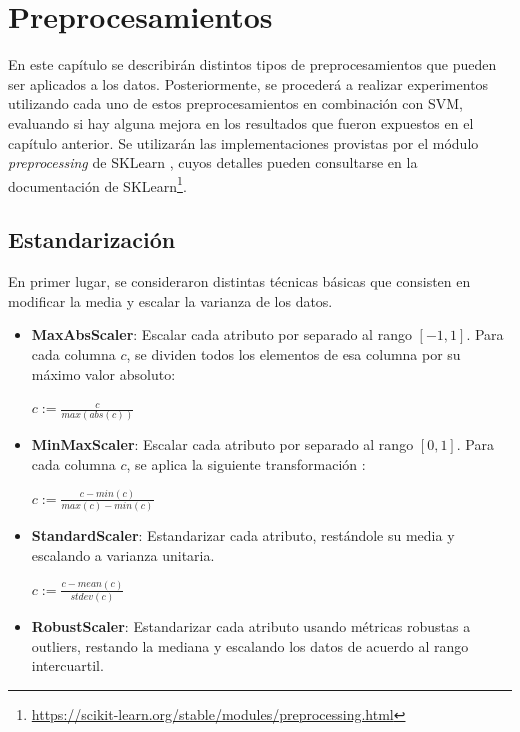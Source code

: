 \chapter{Preprocesamientos}

En este capítulo se describirán distintos tipos de preprocesamientos que pueden ser aplicados a los datos. Posteriormente, se procederá a realizar experimentos utilizando cada uno de estos preprocesamientos en combinación con SVM, evaluando si hay alguna mejora en los resultados que fueron expuestos en el capítulo anterior. Se utilizarán las implementaciones provistas por el módulo \textit{preprocessing} de SKLearn \cite{sklearn_api}, cuyos detalles pueden consultarse en la documentación de SKLearn\footnote{ \url{https://scikit-learn.org/stable/modules/preprocessing.html} }. 

\section { Estandarización }

En primer lugar, se consideraron distintas técnicas básicas que consisten en modificar la media y escalar la varianza de los datos. \cite{han2012mining}

\begin{itemize}
\item \textbf{MaxAbsScaler}: Escalar cada atributo por separado al rango $[-1,1]$. Para cada columna $c$, se dividen todos los elementos de esa columna por su máximo valor absoluto:

\begin{center}
$ c := \frac{c}{max(abs(c))} $
\end{center}

\item \textbf{MinMaxScaler}: Escalar cada atributo por separado al rango $[0,1]$. Para cada columna $c$, se aplica la siguiente transformación \cite{han2012mining}:

\begin{center}
$ c := \frac{ c - min(c) } { max(c) - min(c) }$
\end{center}

\item \textbf{StandardScaler}: Estandarizar cada atributo, restándole su media y escalando a varianza unitaria.

\begin{center}
$ c := \frac{ c - mean(c) } { stdev(c) }$
\end{center}

\item \textbf{RobustScaler}: Estandarizar cada atributo usando métricas robustas a outliers, restando la mediana y escalando los datos de acuerdo al rango intercuartil.

\end{itemize}

